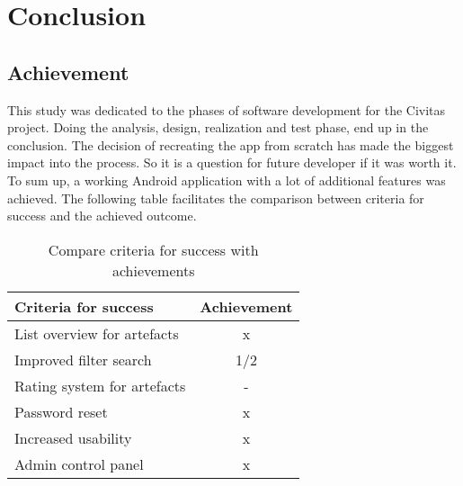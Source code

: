 \newpage
\chapter{Conclusion}\label{cap:Conclusion}

\section{Achievement}
This study was dedicated to the phases of software development for the Civitas project. Doing the analysis, design, realization and test phase, end up in the conclusion. The decision of recreating the app from scratch has made the biggest impact into the process. So it is a question for future developer if it was worth it. To sum up, a working Android application with a lot of additional features was achieved. The following table facilitates the comparison between criteria for success and the achieved outcome.

\begin{table}[h]
\centering
\begin{tabular}{|l|c|}
\hline
\textbf{Criteria for success} & \multicolumn{1}{l|}{\textbf{Achievement}} \\ \hline
List overview for artefacts   & x                                         \\ \hline
Improved filter search        & 1/2                                       \\ \hline
Rating system for artefacts   & -                                         \\ \hline
Password reset                & x                                         \\ \hline
Increased usability           & x                                         \\ \hline
Admin control panel           & x                                         \\ \hline
\end{tabular}
\label{tab:comparison}
\caption{Compare criteria for success with achievements}
\end{table}

